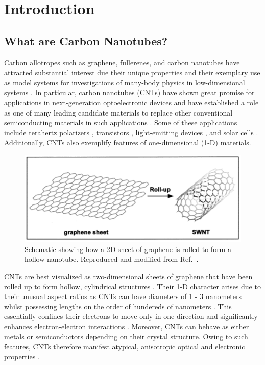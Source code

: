 \chapter{Introduction}

\section{What are Carbon Nanotubes?}

Carbon allotropes such as graphene, fullerenes, and carbon nanotubes have attracted substantial interest due their unique properties and their exemplary use as model systems for investigations of many-body physics in low-dimensional systems \cite{zaytseva2016carbon, nanot2012optoelectronic, soavi2016ultrafast}. In particular, carbon nanotubes (CNTs) have shown great promise for applications in next-generation optoelectronic devices and have established a role as one of many leading candidate materials to replace other conventional semiconducting materials in such applications \cite{nanot2012optoelectronic}. Some of these applications include terahertz polarizers \cite{ren2009carbon}, transistors \cite{qiu2017scaling}, light-emitting devices \cite{liu2015electrically}, and solar cells \cite{kongkanand2007single}. Additionally, CNTs also exemplify features of one-dimensional (1-D) materials.

\begin{figure}[H]
	\centering
	\includegraphics[scale=0.8]{images/chapter_intro/rolled_up_graphene.png}
	\caption{Schematic showing how a 2D sheet of graphene is rolled to form a hollow nanotube. Reproduced and modified from Ref.\ \cite{odom2000structure}.}
\end{figure}

CNTs are best visualized as two-dimensional sheets of graphene that have been rolled up to form hollow, cylindrical structures \cite{odom2000structure,charlier2007electronic}. Their 1-D character arises due to their unusual aspect ratios as CNTs can have diameters of 1 - 3 nanometers whilst possessing lengths on the order of hundereds of nanometers  \cite{zaytseva2016carbon, ando1997excitons}. This essentially confines their electrons to move only in one direction and significantly enhances electron-electron interactions \cite{ando1997excitons}. Moreover, CNTs can behave as either metals or semiconductors depending on their crystal structure. Owing to such features, CNTs therefore manifest atypical, anisotropic optical and electronic properties \cite{weismanKonoBook}.

